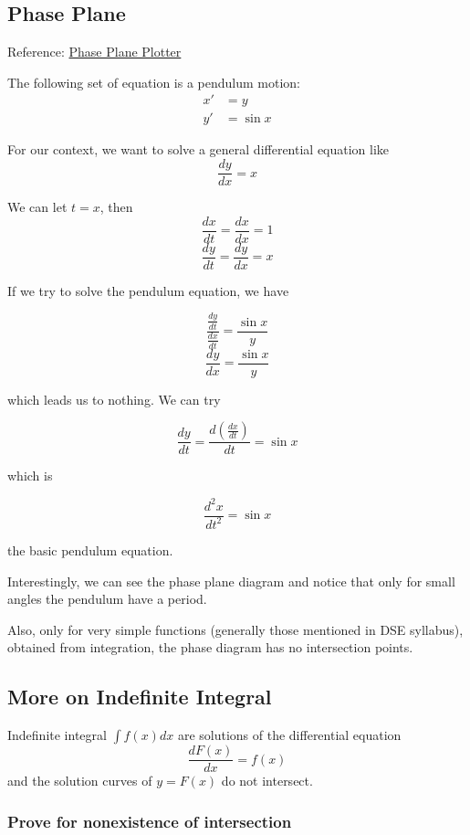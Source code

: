 \subsection{Phase Plane}

Reference: \href{https://aeb019.hosted.uark.edu/pplane.html}{Phase Plane Plotter}

The following set of equation is a pendulum motion:
\begin{equation*}
\begin{split}
x' &= y\\
y' &= \sin x
\end{split}
\end{equation*}

For our context, we want to solve a general differential equation like $$ \frac{dy}{dx} = x $$

We can let $t = x$, then
$$ \frac{dx}{dt} = \frac{dx}{dx} = 1 $$
$$ \frac{dy}{dt} = \frac{dy}{dx} = x $$

If we try to solve the pendulum equation, we have

$$ \frac{\frac{dy}{dt}}{\frac{dx}{dt}} = \frac{\sin x}{y} $$
$$ \frac{dy}{dx} = \frac{\sin x}{y} $$

which leads us to nothing. We can try

$$ \frac{dy}{dt} = \frac{d(\frac{dx}{dt})}{dt} = \sin x $$

which is

$$ \frac{d^2x}{dt^2} = \sin x $$

the basic pendulum equation.

Interestingly, we can see the phase plane diagram and notice that only for small angles the pendulum have a period.

Also, only for very simple functions (generally those mentioned in DSE syllabus), obtained from integration, the phase diagram has no intersection points.

\subsection{More on Indefinite Integral}

Indefinite integral $\int f(x) dx$ are solutions of the differential equation $$ \frac{dF(x)}{dx} = f(x) $$
and the solution curves of $y = F(x)$ do not intersect.

\subsubsection{Prove for nonexistence of intersection}

